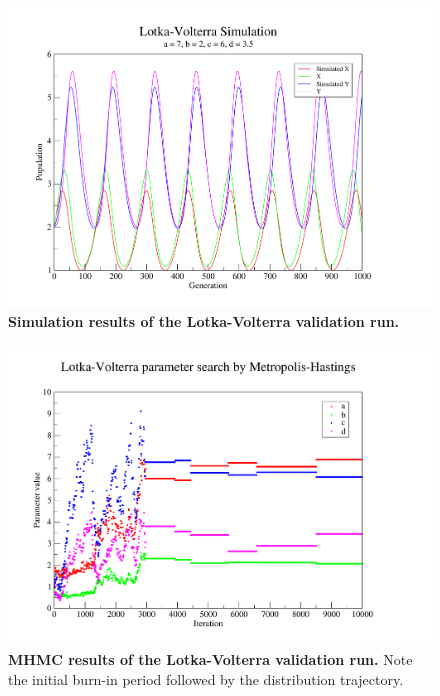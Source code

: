 \begin{figure}[tbp]
 \centering
 \includegraphics[width=14cm, trim=75px 50px 125px 25px]{./03-parameterestimationmethodologies/data/LV_data.pdf}
 \caption[{Simulation results of the Lotka-Volterra validation run.}]{{\bf Simulation results of the Lotka-Volterra validation run.}
 \label{fig:simulation}}
\end{figure}

\begin{figure}[tbp]
 \centering
 \includegraphics[width=14cm, trim=75px 50px 125px 25px]{./03-parameterestimationmethodologies/data/LV_MCMC.pdf}
 \caption[{MHMC results of the Lotka-Volterra validation run.}]{{\bf MHMC results of the Lotka-Volterra validation run.} Note the initial burn-in period followed by the distribution trajectory.
 \label{fig:parameters}}
\end{figure}

